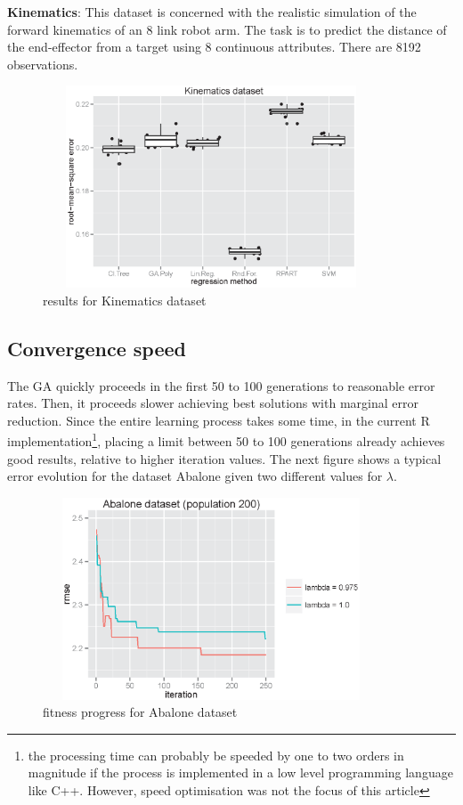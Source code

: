 \documentclass[a4paper, 12pt]{article}
\begin{document}

\textbf{Kinematics}: This dataset is concerned with the realistic simulation of the forward kinematics of an 8 link robot arm. The task is to predict the distance of the end-effector from a target using 8 continuous attributes. There are 8192 observations.

\begin{figure}[htb]
	\begin{center}
		\includegraphics[height=6cm,width=10cm,angle=0]
			{figures/Kinematics_dataset_lambda1.0.eps}
		\caption{results for Kinematics dataset}
	\end{center}
\end{figure}

\subsection{Convergence speed}

The GA quickly proceeds in the first 50 to 100 generations to reasonable error rates. Then, it proceeds slower achieving best solutions with marginal error reduction. Since the entire learning process takes some time, in the current R implementation\footnote{the processing time can probably be speeded by one to two orders in magnitude if the process is implemented in a low level programming language like C++. However, speed optimisation was not the focus of this article}, placing a limit between 50 to 100 generations already achieves good results, relative to higher iteration values. The next figure shows a typical error evolution for the dataset Abalone given two different values for $\lambda$.

\begin{figure}[htb]
	\begin{center}
		\includegraphics[height=6cm,width=10cm,angle=0]
			{figures/Abalone_fitnessProgress.eps}
		\caption{fitness progress for Abalone dataset}
	\end{center}
\end{figure}
\end{document}
